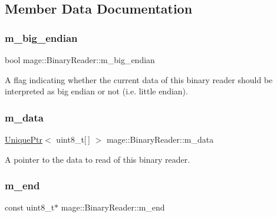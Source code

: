 \subsection{Member Data Documentation}
\hypertarget{classmage_1_1_binary_reader_a8d23fde958e08efe248edb5d92861113}{}\label{classmage_1_1_binary_reader_a8d23fde958e08efe248edb5d92861113} 
\subsubsection{\texorpdfstring{m\+\_\+big\+\_\+endian}{m\_big\_endian}}
{\footnotesize\ttfamily bool mage\+::\+Binary\+Reader\+::m\+\_\+big\+\_\+endian\hspace{0.3cm}{\ttfamily [private]}}

A flag indicating whether the current data of this binary reader should be interpreted as big endian or not (i.\+e. little endian). \hypertarget{classmage_1_1_binary_reader_a34820a214a5b98e09beb12e8a465b0e3}{}\label{classmage_1_1_binary_reader_a34820a214a5b98e09beb12e8a465b0e3} 
\subsubsection{\texorpdfstring{m\+\_\+data}{m\_data}}
{\footnotesize\ttfamily \hyperlink{namespacemage_a8c307fbcc33bce9b7f2aa4c26c3b95cf}{Unique\+Ptr}$<$ uint8\+\_\+t\mbox{[}$\,$\mbox{]} $>$ mage\+::\+Binary\+Reader\+::m\+\_\+data\hspace{0.3cm}{\ttfamily [private]}}

A pointer to the data to read of this binary reader. \hypertarget{classmage_1_1_binary_reader_a929b6480629014c24263ec3042b1f364}{}\label{classmage_1_1_binary_reader_a929b6480629014c24263ec3042b1f364} 
\subsubsection{\texorpdfstring{m\+\_\+end}{m\_end}}
{\footnotesize\ttfamily const uint8\+\_\+t$\ast$ mage\+::\+Binary\+Reader\+::m\+\_\+end\hspace{0.3cm}{\ttfamily [private]}}

